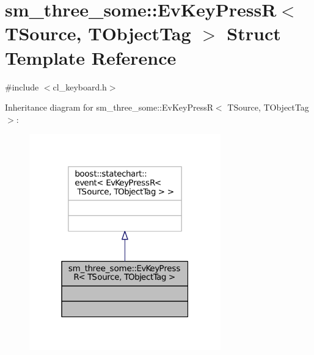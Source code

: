 \hypertarget{structsm__three__some_1_1EvKeyPressR}{}\section{sm\+\_\+three\+\_\+some\+:\+:Ev\+Key\+PressR$<$ T\+Source, T\+Object\+Tag $>$ Struct Template Reference}
\label{structsm__three__some_1_1EvKeyPressR}


{\ttfamily \#include $<$cl\+\_\+keyboard.\+h$>$}



Inheritance diagram for sm\+\_\+three\+\_\+some\+:\+:Ev\+Key\+PressR$<$ T\+Source, T\+Object\+Tag $>$\+:
\nopagebreak
\begin{figure}[H]
\begin{center}
\leavevmode
\includegraphics[width=235pt]{structsm__three__some_1_1EvKeyPressR__inherit__graph}
\end{center}
\end{figure}


